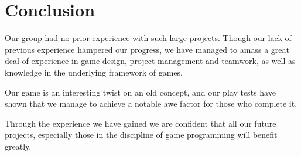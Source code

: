 \documentclass[sponsored]{acmsiggraph}
\begin{document}
\section{Conclusion}

Our group had no prior experience with such large projects. Though our lack of previous experience hampered our progress, we have managed to amass a great deal of experience in game design, project management and teamwork, as well as knowledge in the underlying framework of games.

Our game is an interesting twist on an old concept, and our play tests have shown that we manage to achieve a notable awe factor for those who complete it.

Through the experience we have gained we are confident that all our future projects, especially those in the discipline of game programming will benefit greatly.



%



\end{document}
